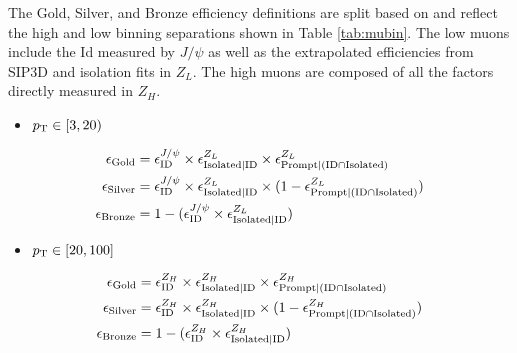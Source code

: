 




 The Gold, Silver, and Bronze efficiency definitions are split based on \pt and reflect the high and low binning separations shown in Table \ref{tab:mubin}. The low \pt muons include the Id measured by $J/\psi$ as well as the extrapolated efficiencies from SIP3D and isolation fits in $Z_{L}$. The high \pt muons are composed of all the factors directly measured in $Z_H$.

\begin{itemize}
\item[] $p_{\mathrm{T}} \in [3,20)$
\end{itemize}
\begin{equation}\label{eq:effcomp_J}
\begin{split}
\epsilon_{\text{Gold}}& = \epsilon_{\text{ID}}^{J/\psi}\times \epsilon_{\text{Isolated}|\text{ID}}^{Z_L} \times \epsilon_{\text{Prompt}|(\text{ID} \cap \text{Isolated})}^{Z_L} \\
\epsilon_{\text{Silver}}& = \epsilon_{\text{ID}}^{J/\psi} \times \epsilon_{\text{Isolated}|\text{ID}}^{Z_L} \times (1-\epsilon_{\text{Prompt}|(\text{ID} \cap \text{Isolated})}^{Z_L}) \\
\epsilon_{\text{Bronze}}& = 1-(\epsilon_{\text{ID}}^{J/\psi} \times \epsilon_{\text{Isolated}|\text{ID}}^{Z_L})
\end{split}
\end{equation}
\begin{itemize}
\item[] $p_{\mathrm{T}} \in [20,100 ]$
\end{itemize}
\begin{equation}\label{eq:effcomp_Z}
\begin{split}
\epsilon_{\text{Gold}}& = \epsilon_{\text{ID}}^{Z_H}\times\epsilon_{\text{Isolated}|\text{ID}}^{Z_H}\times\epsilon_{\text{Prompt}|(\text{ID} \cap \text{Isolated})}^{Z_H} \\
\epsilon_{\text{Silver}}& = \epsilon_{\text{ID}}^{Z_H}\times\epsilon_{\text{Isolated}|\text{ID}}^{Z_H}\times(1-\epsilon_{\text{Prompt}|(\text{ID} \cap \text{Isolated})}^{Z_H})\\
\epsilon_{\text{Bronze}}& = 1-(\epsilon_{\text{ID}}^{Z_H} \times \epsilon_{\text{Isolated}|\text{ID}}^{Z_H})
\end{split}
\end{equation}

